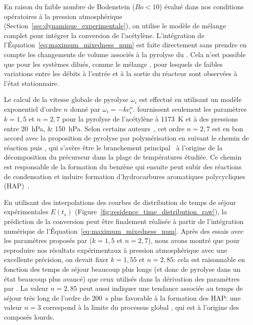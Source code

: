 En raison du faible nombre de Bodenstein ($Bo{}<{}10$) évalué dans nos conditions opératoires à la pression atmosphérique (Section~\ref{sec:dynamique_experimentale}), on utilise le modèle de mélange complet pour intégrer la conversion de l'acétylène. L'intégration de l'Équation~\ref{eq:maximum_mixedness_num} est faite directement sans prendre en compte les changements de volume associés à la pyrolyse du . Cela n'est possible que pour les systèmes dilués, comme le mélange , pour lesquels de faibles variations entre les débits à l'entrée et à la sortie du réacteur sont observées à l'état stationnaire.

Le calcul de la vitesse globale de pyrolyse $\dot{\omega}_{i}$ est effectué en utilisant un modèle exponentiel d'ordre $n$ donné par $\dot{\omega}_{i}=-kc_{i}^{n}$. \citet{Norinaga2005} fournissent seulement les paramètres $k=1,5$ et $n=2,7$ pour la pyrolyse de l'acétylène à \SI{1173}{\kelvin} et à des pressions entre \SIlist{20;150}{\hecto\pascal}. Selon certains auteurs~\cite{Norinaga2005}, cet ordre $n=2,7$ est en bon accord avec la proposition de \og{}pyrolyse par polymérisation\fg{} en suivant le chemin de réaction  puis , qui s'avère être le branchement principal~\cite{Norinaga2007} à l'origine de la décomposition du précurseur  dans la plage de températures étudiée. Ce chemin est responsable de la formation du benzène qui ensuite peut subir des réactions de condensation et induire formation d'hydrocarbures aromatiques polycycliques (HAP)~\cite{Ziegler2005a,Norinaga2009}. 

En utilisant des interpolations des courbes de distribution de temps de séjour expérimentales $E(t_{s})$ (Figure~\ref{fig:residence_time_distribution_raw}), la prédiction de la conversion peut être finalement réalisée à partir de l'intégration numérique de l'Équation~\ref{eq:maximum_mixedness_num}. Après des essais avec les paramètres proposés par \citet{Norinaga2005} ($k=1,5$ et $n=2,7$), nous avons montré que pour reproduire nos résultats expérimentaux à pression atmosphérique avec une excellente précision, on devait fixer $k=1,55$ et $n=2,85$: cela est raisonnable en fonction des temps de séjour beaucoup plus longs (et donc de pyrolyse dans un état beaucoup plus avancé) que ceux utilisés dans la dérivation des paramètres par \citet{Norinaga2005}. La valeur $n=2,85$ peut aussi indiquer une tendance \textendash{} associée au temps de séjour très long de l'ordre de \SI{200}{\second} \textendash{} plus favorable à la formation des HAP: une valeur $n=3$ correspond à la limite du processus global , qui est à l'origine des composés lourds. 

